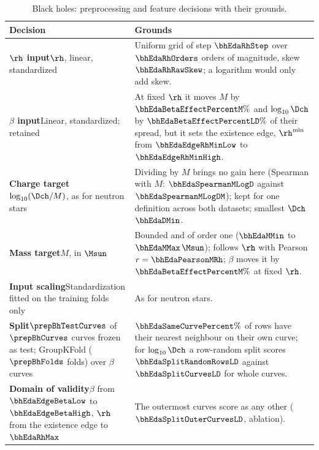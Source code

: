 \begin{table}[!htb]
\centering
\caption{Black holes: preprocessing and feature decisions with their grounds.}
\label{tab:decisions-bh}
\renewcommand{\arraystretch}{1.2}
\small
\begin{tabular}{p{4.2cm} p{7.4cm}}
\toprule
Decision & Grounds \\
\midrule
\textbf{$\rh$ input}\newline $\rh$, linear, standardized &
Uniform grid of step $\bhEdaRhStep$ over $\bhEdaRhOrders$ orders of magnitude, skew $\bhEdaRhRawSkew$; a logarithm would only add skew. \\
\textbf{$\beta$ input}\newline Linear, standardized; retained &
At fixed $\rh$ it moves $M$ by $\bhEdaBetaEffectPercentM\%$ and $\log_{10}\Dch$ by $\bhEdaBetaEffectPercentLD\%$ of their spread, but it sets the existence edge, $\rh^{\min}$ from $\bhEdaEdgeRhMinLow$ to $\bhEdaEdgeRhMinHigh$. \\
\textbf{Charge target}\newline $\log_{10}(\Dch/M)$, as for neutron stars &
Dividing by $M$ brings no gain here (Spearman with $M$: $\bhEdaSpearmanMLogD$ against $\bhEdaSpearmanMLogDM$); kept for one definition across both datasets; smallest $\Dch$ $\bhEdaDMin$. \\
\textbf{Mass target}\newline $M$, in $\Msun$ &
Bounded and of order one ($\bhEdaMMin$ to $\bhEdaMMax\,\Msun$); follows $\rh$ with Pearson $r = \bhEdaPearsonMRh$; $\beta$ moves it by $\bhEdaBetaEffectPercentM\%$ at fixed $\rh$. \\
\textbf{Input scaling}\newline Standardization fitted on the training folds only &
As for neutron stars. \\
\textbf{Split}\newline $\prepBhTestCurves$ of $\prepBhCurves$ curves frozen as test; GroupKFold ($\prepBhFolds$ folds) over $\beta$ curves &
$\bhEdaSameCurvePercent\%$ of rows have their nearest neighbour on their own curve; for $\log_{10}\Dch$ a row-random split scores $\bhEdaSplitRandomRowsLD$ against $\bhEdaSplitCurvesLD$ for whole curves. \\
\textbf{Domain of validity}\newline $\beta$ from $\bhEdaEdgeBetaLow$ to $\bhEdaEdgeBetaHigh$, $\rh$ from the existence edge to $\bhEdaRhMax$ &
The outermost curves score as any other ($\bhEdaSplitOuterCurvesLD$, ablation). \\
\bottomrule
\end{tabular}
\end{table}
